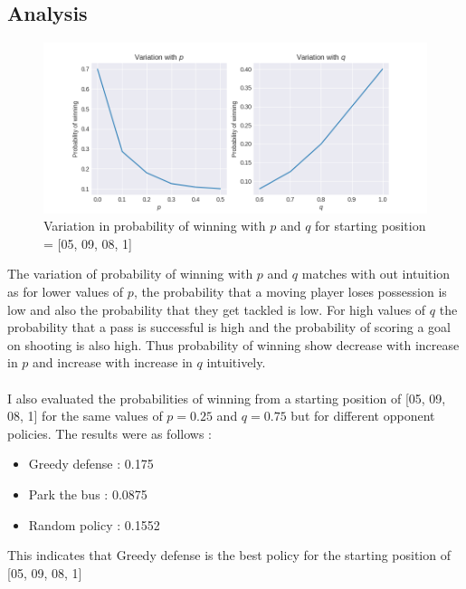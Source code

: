 \documentclass[11pt]{article}
\begin{document}
\subsection*{Analysis}
\begin{figure}[H]
    \begin{center} 
        \includegraphics[width=1\textwidth]{../images/plot3.png}
        \caption*{Variation in probability of winning with $p$ and $q$ for starting position = [05, 09, 08, 1]}
    \end{center}
 \end{figure}
The variation of probability of winning with $p$ and $q$ matches with out intuition as 
for lower values of $p$, the probability that a moving player loses possession is low and also the probability
that they get tackled is low. For high values of $q$ the probability that a pass is successful is high 
and the probability of scoring a goal on shooting is also high. Thus probability of winning show decrease with increase in $p$
and increase with increase in $q$ intuitively.
\noindent
\\
\\
I also evaluated the probabilities of winning from a starting position of [05, 09, 08, 1]
for the same values of $p = 0.25$ and $q = 0.75$ but for different opponent policies. 
The results were as follows :
\begin{itemize}
    \item Greedy defense : 0.175
    \item Park the bus : 0.0875
    \item Random policy : 0.1552
\end{itemize}
This indicates that Greedy defense is the best policy for the starting position of [05, 09, 08, 1]
\end{document}
